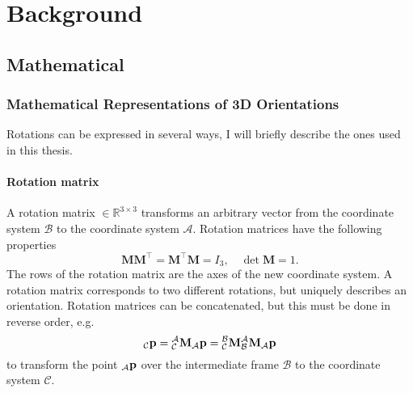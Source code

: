 \chapter{Background}
\label{ch:Background}

\section{Mathematical}
\subsection{Mathematical Representations of 3D Orientations}
Rotations can be expressed in several ways, I will briefly describe the ones used in this thesis.

\subsubsection{Rotation matrix}
A rotation matrix  $\in \mathbb{R}^{3\times3}$ transforms an arbitrary vector from the coordinate system $\mathcal{B}$ to the coordinate system $\mathcal{A}$.
Rotation matrices have the following properties
\begin{equation}
    \mathbf{M}\mathbf{M}^\intercal = \mathbf{M}^\intercal \mathbf{M} = I_3, \quad \det \mathbf{M} = 1.
\end{equation}
The rows of the rotation matrix are the axes of the new coordinate system.
A rotation matrix corresponds to two different rotations, but uniquely describes an orientation.
Rotation matrices can be concatenated, but this must be done in reverse order, e.g.
\begin{equation}
    {}_\mathcal{C}\vb{p} = \mtf{a}{c}{}_\mathcal{A}\vb{p} = \mtf{b}{c}\mtf{a}{b}{}_\mathcal{A}\vb{p}
\end{equation}
to transform the point ${}_\mathcal{A}\vb{p}$ over the intermediate frame $\mathcal{B}$ to the coordinate system $\mathcal{C}$.

